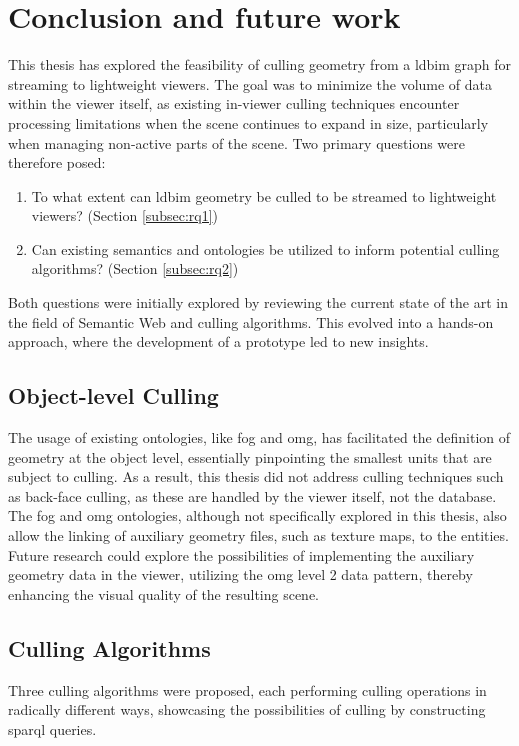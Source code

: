 \chapter{Conclusion and future work} \label{ch:conclusion}
This thesis has explored the feasibility of culling geometry from a \ac{ldbim} graph for streaming to lightweight viewers. The goal was to minimize the volume of data within the viewer itself, as existing in-viewer culling techniques encounter processing limitations when the scene continues to expand in size, particularly when managing non-active parts of the scene. Two primary questions were therefore posed:

\begin{enumerate}
    \item To what extent can \ac{ldbim} geometry be culled to be streamed to lightweight viewers? (Section \ref{subsec:rq1})
    \item Can existing semantics and ontologies be utilized to inform potential culling algorithms? (Section \ref{subsec:rq2})
\end{enumerate}

Both questions were initially explored by reviewing the current state of the art in the field of Semantic Web and culling algorithms. This evolved into a hands-on approach, where the development of a prototype led to new insights.

\section{Object-level Culling}
The usage of existing ontologies, like \ac{fog} and \ac{omg}, has facilitated the definition of geometry at the object level, essentially pinpointing the smallest units that are subject to culling. As a result, this thesis did not address culling techniques such as back-face culling, as these are handled by the viewer itself, not the database. The \ac{fog} and \ac{omg} ontologies, although not specifically explored in this thesis, also allow the linking of auxiliary geometry files, such as texture maps, to the entities. Future research could explore the possibilities of implementing the auxiliary geometry data in the viewer, utilizing the \ac{omg} level 2 data pattern, thereby enhancing the visual quality of the resulting scene.

\section{Culling Algorithms}
Three culling algorithms were proposed, each performing culling operations in radically different ways, showcasing the possibilities of culling by constructing \ac{sparql} queries.

